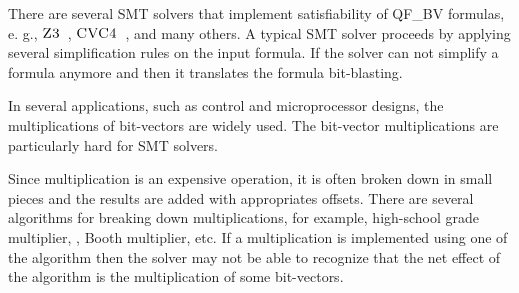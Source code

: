 %
There are several SMT solvers that implement satisfiability of 
QF\_BV formulas, e. g., $\textsc{Z3}$~\cite{z3}, $\textsc{CVC4}$~\cite{cvc4}, 
and many others.
%
A typical SMT solver proceeds by applying several simplification rules
on the input formula.
%
If the solver can not simplify a formula anymore and then it
translates the formula bit-blasting.

%
In several applications, such as control and microprocessor designs,
the multiplications of bit-vectors are widely used.
%
The bit-vector multiplications are particularly hard for SMT solvers.
%

%
Since multiplication is an expensive operation, it is often broken down
in small pieces and the results are added with appropriates offsets.
%
There are several algorithms for breaking down multiplications, for
example, high-school grade multiplier, , Booth
multiplier, etc.
%
If a multiplication is implemented using one of the algorithm then the
solver may not be able to recognize that the net effect of the
algorithm is the multiplication of some bit-vectors.
%
 













